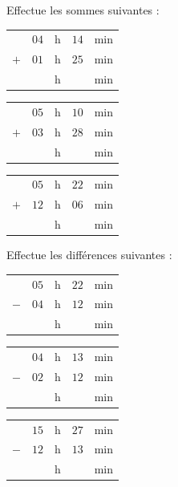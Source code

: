 \begin{pageParcoursu}
 
 Effectue  les sommes suivantes :
 
\begin{minipage}{0.30\linewidth}
\begin{tabular}{ccccc} 
& $04$ & h &  $14$ & min \\ 
$+$   & $01$ & h & $25$  & min\\ 
\hline 
   &  & h & & min\\
\end{tabular} 
\end{minipage}
\hfill 
\begin{minipage}{0.30\linewidth}
 \begin{tabular}{ccccc} 
& $05$ & h &  $10$ & min \\ 
$+$   & $03$ & h &  $28$ & min\\ 
\hline 
   &  & h & & min\\
\end{tabular} 
\end{minipage}
\hfill 
\begin{minipage}{0.30\linewidth}
 \begin{tabular}{ccccc} 
& $05$ & h & $22$  & min \\ 
$+$   & $12$ & h & $06$ & min\\ 
\hline 
   &  & h & & min\\
\end{tabular} 
\end{minipage}
 
 
 

Effectue  les différences suivantes :
 
 
 \begin{minipage}{0.30\linewidth}
\begin{tabular}{ccccc} 
& $05$ & h &  $22$ & min \\ 
$-$   & $04$ & h & $12$ & min\\ 
\hline 
   &  & h & & min\\
\end{tabular} 
\end{minipage}
\hfill 
\begin{minipage}{0.30\linewidth}
 \begin{tabular}{ccccc} 
& $04$ & h &  $13$ & min \\ 
$-$   & $02$ & h &  $12$ & min\\ 
\hline 
   &  & h & & min\\
\end{tabular} 
\end{minipage}
\hfill 
\begin{minipage}{0.30\linewidth}
 \begin{tabular}{ccccc} 
& $15$ & h & $27$  & min \\ 
$-$   & $12$ & h & $13$ & min\\ 
\hline 
   &  & h & & min\\
\end{tabular} 
\end{minipage}
 


\end{pageParcoursu}
